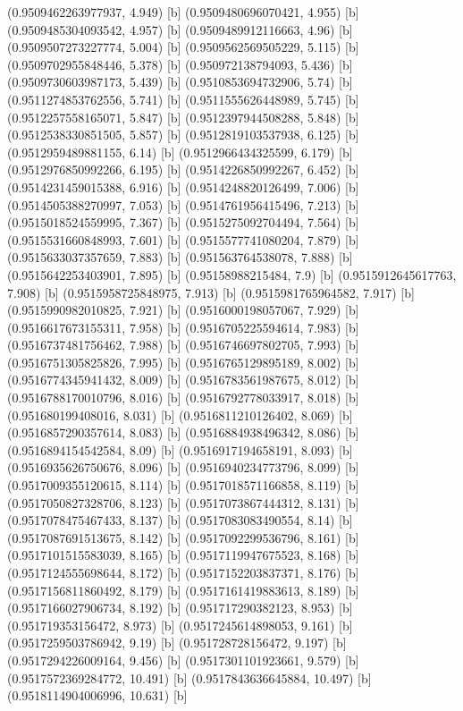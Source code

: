 {{{(0.9509462263977937, 4.949) [b] 
(0.9509480696070421, 4.955) [b] 
(0.9509485304093542, 4.957) [b] 
(0.9509489912116663, 4.96) [b] 
(0.9509507273227774, 5.004) [b] 
(0.9509562569505229, 5.115) [b] 
(0.9509702955848446, 5.378) [b] 
(0.950972138794093, 5.436) [b] 
(0.9509730603987173, 5.439) [b] 
(0.9510853694732906, 5.74) [b] 
(0.9511274853762556, 5.741) [b] 
(0.9511555626448989, 5.745) [b] 
(0.9512257558165071, 5.847) [b] 
(0.9512397944508288, 5.848) [b] 
(0.9512538330851505, 5.857) [b] 
(0.9512819103537938, 6.125) [b] 
(0.9512959489881155, 6.14) [b] 
(0.9512966434325599, 6.179) [b] 
(0.9512976850992266, 6.195) [b] 
(0.9514226850992267, 6.452) [b] 
(0.9514231459015388, 6.916) [b] 
(0.9514248820126499, 7.006) [b] 
(0.9514505388270997, 7.053) [b] 
(0.9514761956415496, 7.213) [b] 
(0.9515018524559995, 7.367) [b] 
(0.9515275092704494, 7.564) [b] 
(0.9515531660848993, 7.601) [b] 
(0.9515577741080204, 7.879) [b] 
(0.9515633037357659, 7.883) [b] 
(0.951563764538078, 7.888) [b] 
(0.9515642253403901, 7.895) [b] 
(0.95158988215484, 7.9) [b] 
(0.9515912645617763, 7.908) [b] 
(0.9515958725848975, 7.913) [b] 
(0.9515981765964582, 7.917) [b] 
(0.9515990982010825, 7.921) [b] 
(0.9516000198057067, 7.929) [b] 
(0.9516617673155311, 7.958) [b] 
(0.9516705225594614, 7.983) [b] 
(0.9516737481756462, 7.988) [b] 
(0.9516746697802705, 7.993) [b] 
(0.9516751305825826, 7.995) [b] 
(0.9516765129895189, 8.002) [b] 
(0.9516774345941432, 8.009) [b] 
(0.9516783561987675, 8.012) [b] 
(0.9516788170010796, 8.016) [b] 
(0.9516792778033917, 8.018) [b] 
(0.951680199408016, 8.031) [b] 
(0.9516811210126402, 8.069) [b] 
(0.9516857290357614, 8.083) [b] 
(0.9516884938496342, 8.086) [b] 
(0.9516894154542584, 8.09) [b] 
(0.9516917194658191, 8.093) [b] 
(0.9516935626750676, 8.096) [b] 
(0.9516940234773796, 8.099) [b] 
(0.9517009355120615, 8.114) [b] 
(0.9517018571166858, 8.119) [b] 
(0.9517050827328706, 8.123) [b] 
(0.9517073867444312, 8.131) [b] 
(0.9517078475467433, 8.137) [b] 
(0.9517083083490554, 8.14) [b] 
(0.9517087691513675, 8.142) [b] 
(0.9517092299536796, 8.161) [b] 
(0.9517101515583039, 8.165) [b] 
(0.9517119947675523, 8.168) [b] 
(0.9517124555698644, 8.172) [b] 
(0.9517152203837371, 8.176) [b] 
(0.9517156811860492, 8.179) [b] 
(0.9517161419883613, 8.189) [b] 
(0.9517166027906734, 8.192) [b] 
(0.951717290382123, 8.953) [b] 
(0.951719353156472, 8.973) [b] 
(0.9517245614898053, 9.161) [b] 
(0.9517259503786942, 9.19) [b] 
(0.951728728156472, 9.197) [b] 
(0.9517294226009164, 9.456) [b] 
(0.9517301101923661, 9.579) [b] 
(0.9517572369284772, 10.491) [b] 
(0.9517843636645884, 10.497) [b] 
(0.9518114904006996, 10.631) [b] 
}}}
